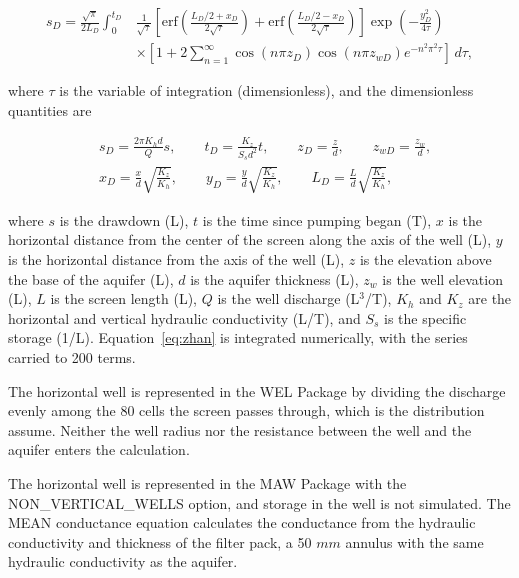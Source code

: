\begin{equation}
	\label{eq:zhan}
	\begin{split}
		s_D = \frac{\sqrt{\pi}}{2 L_D} \int_{0}^{t_D} & \frac{1}{\sqrt{\tau}}
		\left[ \mathrm{erf} \left( \frac{L_D / 2 + x_D}{2 \sqrt{\tau}} \right)
		+ \mathrm{erf} \left( \frac{L_D / 2 - x_D}{2 \sqrt{\tau}} \right) \right]
		\exp \left( - \frac{y_D^2}{4 \tau} \right) \\
		& \times \left[ 1 + 2 \sum_{n=1}^{\infty} \cos \left( n \pi z_D \right)
		\cos \left( n \pi z_{wD} \right) e^{-n^2 \pi^2 \tau} \right] \, d\tau ,
	\end{split}
\end{equation}

\noindent where $\tau$ is the variable of integration (dimensionless), and the dimensionless quantities are

\begin{equation}
	\label{eq:zhan-dimensionless}
	\begin{split}
		& s_D = \frac{2 \pi K_h d}{Q} s , \qquad
		t_D = \frac{K_z}{S_s d^2} t , \qquad
		z_D = \frac{z}{d} , \qquad
		z_{wD} = \frac{z_w}{d} , \\
		& x_D = \frac{x}{d} \sqrt{\frac{K_z}{K_h}} , \qquad
		y_D = \frac{y}{d} \sqrt{\frac{K_z}{K_h}} , \qquad
		L_D = \frac{L}{d} \sqrt{\frac{K_z}{K_h}} ,
	\end{split}
\end{equation}

\noindent where $s$ is the drawdown (L), $t$ is the time since pumping began (T), $x$ is the horizontal distance from the center of the screen along the axis of the well (L), $y$ is the horizontal distance from the axis of the well (L), $z$ is the elevation above the base of the aquifer (L), $d$ is the aquifer thickness (L), $z_w$ is the well elevation (L), $L$ is the screen length (L), $Q$ is the well discharge (L$^3$/T), $K_h$ and $K_z$ are the horizontal and vertical hydraulic conductivity (L/T), and $S_s$ is the specific storage (1/L). Equation~\ref{eq:zhan} is integrated numerically, with the series carried to 200 terms.

The horizontal well is represented in the WEL Package by dividing the discharge evenly among the 80 cells the screen passes through, which is the distribution \cite{zhan2001} assume. Neither the well radius nor the resistance between the well and the aquifer enters the calculation.

The horizontal well is represented in the MAW Package with the NON\_VERTICAL\_WELLS option, and storage in the well is not simulated. The MEAN conductance equation calculates the conductance from the hydraulic conductivity and thickness of the filter pack, a 50 $mm$ annulus with the same hydraulic conductivity as the aquifer.

